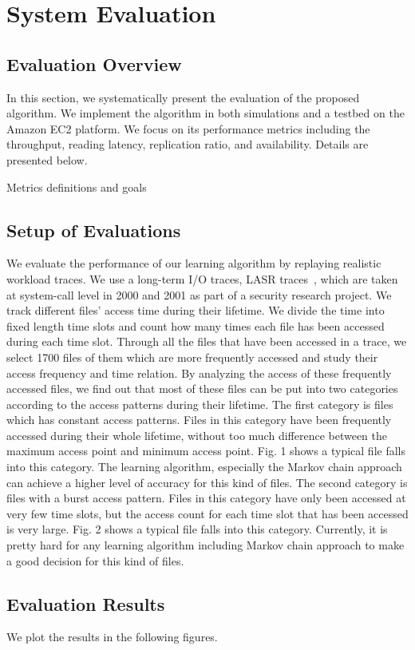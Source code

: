 \section{System Evaluation}
\label{evaluation}

\subsection{Evaluation Overview}

In this section, we systematically present the evaluation of the proposed algorithm. We implement the algorithm in both simulations and a testbed on the Amazon EC2 platform. We focus on its performance metrics including the throughput, reading latency, replication ratio, and availability. Details are presented below.

Metrics definitions and goals


\subsection{Setup of Evaluations}

We evaluate the performance of our learning algorithm by replaying realistic workload traces. We use a long-term I/O traces, LASR traces~\cite{}, which are taken at system-call level in 2000 and 2001 as part of a security research project.
We track different files' access time during their lifetime. We divide the time into fixed length time slots and count how many times each file has been accessed during each time slot.
Through all the files that have been accessed in a trace, we select 1700 files of them which are more frequently accessed and study their access frequency and time relation.
By analyzing the access of these frequently accessed files, we find out that most of these files can be put into two categories according to the access patterns during their lifetime.
The first category is files which has constant access patterns. Files in this category have been frequently accessed during their whole lifetime, without too much difference between the maximum access point and minimum access point.
Fig. 1 shows a typical file falls into this category. The learning algorithm, especially the Markov chain approach can achieve a higher level of accuracy for this kind of files.
The second category is files with a burst access pattern. Files in this category have only been accessed at very few time slots, but the access count for each time slot that has been accessed is very large.
Fig. 2 shows a typical file falls into this category. Currently, it is pretty hard for any learning algorithm including Markov chain approach to make a good decision for this kind of files.



\subsection{Evaluation Results}

We plot the results in the following figures.
